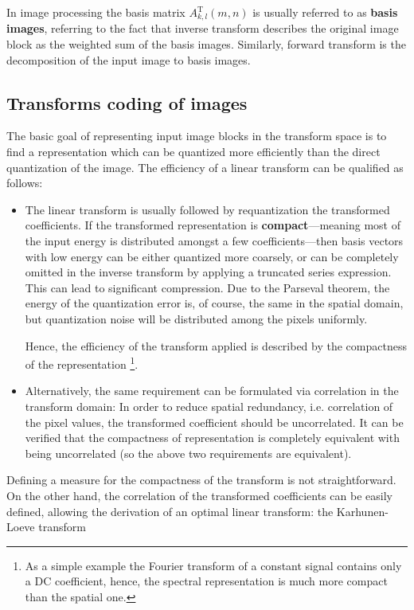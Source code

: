In image processing the basis matrix $A_{k,l}^{\mathrm{T}}(m,n)$ is usually referred to as \textbf{basis images}, referring to the fact that inverse transform describes the original image block as the weighted sum of the basis images.
Similarly, forward transform is the decomposition of the input image to basis images.

\subsection{Transforms coding of images}

The basic goal of representing input image blocks in the transform space is to find a representation which can be quantized more efficiently than the direct quantization of the image.
The efficiency of a linear transform can be qualified as follows:
\begin{itemize}
\item The linear transform is usually followed by requantization the transformed coefficients.
If the transformed representation is \textbf{compact}---meaning most of the input energy is distributed amongst a few coefficients---then basis vectors with low energy can be either quantized more coarsely, or can be completely omitted in the inverse transform by applying a truncated series expression.
This can lead to significant compression.
Due to the Parseval theorem, the energy of the quantization error is, of course, the same in the spatial domain, but quantization noise will be distributed among the pixels uniformly.

Hence, the efficiency of the transform applied is described by the compactness of the representation \footnote{As a simple example the Fourier transform of a constant signal contains only a DC coefficient, hence, the spectral representation is much more compact than the spatial one.}.
\item Alternatively, the same requirement can be formulated via correlation in the transform domain:
In order to reduce spatial redundancy, i.e. correlation of the pixel values, the transformed coefficient should be uncorrelated.
It can be verified that the compactness of representation is completely equivalent with being uncorrelated (so the above two requirements are equivalent).
\end{itemize}

Defining a measure for the compactness of the transform is not straightforward.
On the other hand, the correlation of the transformed coefficients can be easily defined, allowing the derivation of an optimal linear transform: the Karhunen-Loeve transform

